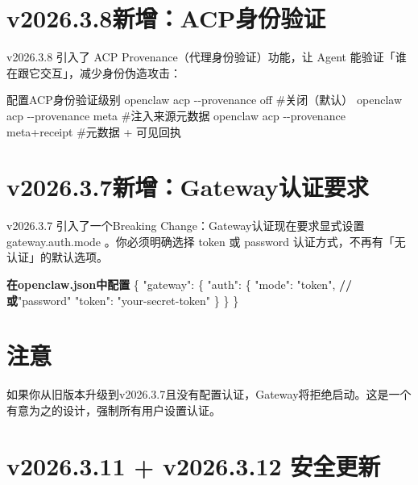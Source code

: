 \documentclass[
  10
]{article}
\newenvironment{Shaded}{}{}
\newcommand{\DataTypeTok}[1]{\textcolor[rgb]{0.56,0.13,0.00}{#1}}
\newcommand{\ErrorTok}[1]{\textcolor[rgb]{1.00,0.00,0.00}{\textbf{#1}}}
\newcommand{\FunctionTok}[1]{\textcolor[rgb]{0.02,0.16,0.49}{#1}}
\newcommand{\NormalTok}[1]{#1}
\newcommand{\StringTok}[1]{\textcolor[rgb]{0.25,0.44,0.63}{#1}}
\begin{document}
\section{v2026.3.8新增：ACP身份验证}\label{v2026.3.8ux65b0ux589eacpux8eabux4efdux9a8cux8bc1}

v2026.3.8 引入了 ACP Provenance（代理身份验证）功能，让 Agent
能验证「谁在跟它交互」，减少身份伪造攻击：

\begin{Shaded}
\begin{Highlighting}[]
\NormalTok{配置ACP身份验证级别  }
\NormalTok{openclaw acp {-}{-}provenance off \#关闭（默认）  }
\NormalTok{openclaw acp {-}{-}provenance meta \#注入来源元数据  }
\NormalTok{openclaw acp {-}{-}provenance meta+receipt \#元数据 + 可见回执}
\end{Highlighting}
\end{Shaded}

\section{v2026.3.7新增：Gateway认证要求}\label{v2026.3.7ux65b0ux589egatewayux8ba4ux8bc1ux8981ux6c42}

v2026.3.7 引入了一个Breaking Change：Gateway认证现在要求显式设置
gateway.auth.mode 。你必须明确选择 token 或 password
认证方式，不再有「无认证」的默认选项。

\begin{Shaded}
\begin{Highlighting}[]
\ErrorTok{在openclaw.json中配置}  
\FunctionTok{\{} \DataTypeTok{"gateway"}\FunctionTok{:} \FunctionTok{\{} \DataTypeTok{"auth"}\FunctionTok{:} \FunctionTok{\{} \DataTypeTok{"mode"}\FunctionTok{:} \StringTok{"token"}\FunctionTok{,} \ErrorTok{//或}\DataTypeTok{"password"} \DataTypeTok{"token"}\FunctionTok{:} \StringTok{"your{-}secret{-}token"} \FunctionTok{\}} \FunctionTok{\}} \FunctionTok{\}}
\end{Highlighting}
\end{Shaded}

\section{注意}\label{ux6ce8ux610f-21}

如果你从旧版本升级到v2026.3.7且没有配置认证，Gateway将拒绝启动。这是一个有意为之的设计，强制所有用户设置认证。

\section{v2026.3.11 + v2026.3.12
安全更新}\label{v2026.3.11-v2026.3.12-ux5b89ux5168ux66f4ux65b0}
\end{document}

